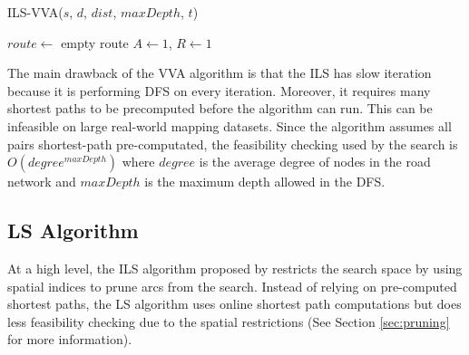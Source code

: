\documentclass[honors]{union-cs-thesis}
\newcommand{\td}{\todo[inline]}
\begin{document}
%
%
\begin{algorithm}[!h ]
    \caption{ILS-VVA($s$, $d$, $dist$, $maxDepth$, $t$) \label{alg:ils-ver}}
    
    $route \gets$ empty route\;
    $A \gets 1$, $R \gets 1$\;
    
    
\end{algorithm}

The main drawback of the VVA algorithm is that the ILS has slow iteration because it is performing DFS on every iteration.  Moreover, it requires many shortest paths to be precomputed before the algorithm can run. This can be infeasible on large real-world  mapping datasets. Since the algorithm assumes all pairs shortest-path pre-computated, the feasibility checking used by the search is $O(degree^{maxDepth})$ where $degree$ is the average degree of nodes in the road network and $maxDepth$ is the maximum depth allowed in the DFS.

\subsection{LS Algorithm}
At a high level, the ILS algorithm proposed by \citeauthor{lu2015arc} restricts the search space by using spatial indices to prune arcs from the search. Instead of relying on pre-computed shortest paths, the LS algorithm uses online shortest path computations but does less feasibility checking due to the spatial restrictions (See Section \ref{sec:pruning} for more information).
\end{document}
